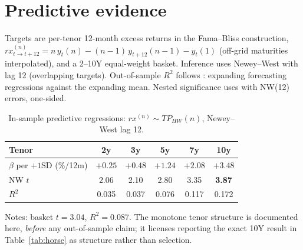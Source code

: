 \documentclass[11pt]{article}
\begin{document}
\section{Predictive evidence}\label{sec:pred}

Targets are per-tenor 12-month excess returns in the Fama--Bliss construction,
$rx^{(n)}_{t\to t+12}=n\,y_t(n)-(n\!-\!1)\,y_{t+12}(n\!-\!1)-y_t(1)$ (off-grid maturities
interpolated), and a 2--10Y equal-weight basket. Inference uses Newey--West with lag 12
(overlapping targets). Out-of-sample $R^2$ follows \citet{campbellthompson}: expanding
forecasting regressions against the expanding mean. Nested significance uses
\citet{clarkwest} with NW(12) errors, one-sided.

\begin{table}[t]\centering
\caption{In-sample predictive regressions: $rx^{(n)}\sim TP_{HW}(n)$, Newey--West lag 12.}
\label{tab:tenor}
\begin{tabular}{lccccc}
\toprule
Tenor & 2y & 3y & 5y & 7y & 10y \\
\midrule
$\beta$ per $+1$SD (\%/12m) & $+0.25$ & $+0.48$ & $+1.24$ & $+2.08$ & $+3.48$ \\
NW $t$ & 2.06 & 2.10 & 2.80 & 3.35 & \textbf{3.87} \\
$R^2$ & 0.035 & 0.037 & 0.076 & 0.117 & 0.172 \\
\bottomrule
\end{tabular}
\par\smallskip
\footnotesize Notes: basket $t=3.04$, $R^2=0.087$. The monotone tenor structure is
documented here, \emph{before} any out-of-sample claim; it licenses reporting the exact
10Y result in Table~\ref{tab:horse} as structure rather than selection.
\end{table}
\end{document}
